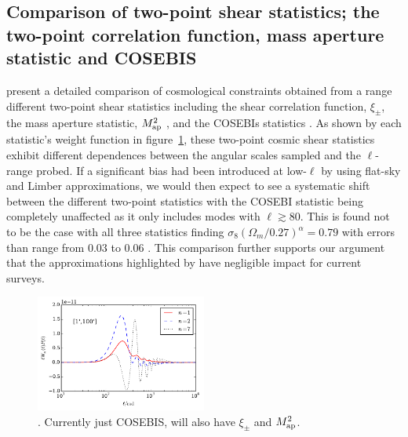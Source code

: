 \subsection{Comparison of two-point shear statistics; the two-point correlation function, mass aperture statistic and COSEBIS}
\citet{kilbinger/etal:2013} present a detailed comparison of cosmological constraints obtained from a range different two-point shear statistics including the shear correlation function, $\xi_\pm$, the mass aperture statistic, $M_ {\rm ap}^2$ \citep{schneider/etal:1998}, and the COSEBIs statistics \citep{schneider/etal:2010}.  As shown by each statistic's weight function in figure~\ref{fig:filters}, these two-point cosmic shear statistics exhibit different dependences between the angular scales sampled and the $\ell$-range probed.   If a significant bias had been introduced at low-$\ell$ by using flat-sky and Limber approximations, we would then expect to see a systematic shift between the different two-point statistics with the COSEBI statistic being completely unaffected as it only includes modes with $\ell \gtrsim 80$.  This is found not to be the case with all three statistics finding $\sigma_8 (\Omega_m/0.27)^\alpha = 0.79$ with errors than range from $0.03$ to $0.06$ \citep[see Table 5 of][]{kilbinger/etal:2013}.  This comparison further supports our argument that the approximations highlighted by \citet{kitching/etal:2016} have negligible impact for current surveys.

\begin{figure}[htb]
\begin{center}
\includegraphics[width=0.5\textwidth]{figures/ellWnPell1-100.pdf}
\caption{ \label{fig:filters}.  Currently just COSEBIS, will also have $\xi_\pm$ and $M_{\rm ap}^2$.}
\end{center}
\end{figure}






